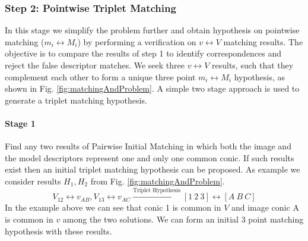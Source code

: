 \documentclass{bmvc2k}
\begin{document}
\subsubsection{Step 2: Pointwise Triplet Matching}
In this stage we simplify the problem further and obtain hypothesis on pointwise matching ($ m_i \leftrightarrow M_i $) by performing a verification on $ v \leftrightarrow V $ matching results. 
The objective is to compare the results of step 1 to identify correspondences and reject the false descriptor matches. 
We seek three $ v \leftrightarrow V $ results, such that they complement each other to form a unique three point $ m_i \leftrightarrow M_i $ hypothesis, as shown in Fig. \ref{fig:matchingAndProblem}. 
A simple two stage approach is used to generate a triplet matching hypothesis. 
\paragraph{Stage 1} Find any two results of Pairwise Initial Matching in which both the image and the model descriptors represent one and only one common conic. If such results exist then an initial triplet matching hypothesis can be proposed. 
As example we consider results $ H_1 , H_2 $ from Fig. \ref{fig:matchingAndProblem}.
\[
 V_{12} \leftrightarrow v_{AB},V_{13} \leftrightarrow v_{AC } \xrightarrow{\text{Triplet Hypothesis}} [1~2~3] \leftrightarrow [A~B~ C]
\]
In the example above we can see that conic 1 is common in $ V $ and image conic A is common in $ v $ among the two solutions. We can form an initial 3 point matching hypothesis with these results. 
\end{document}
